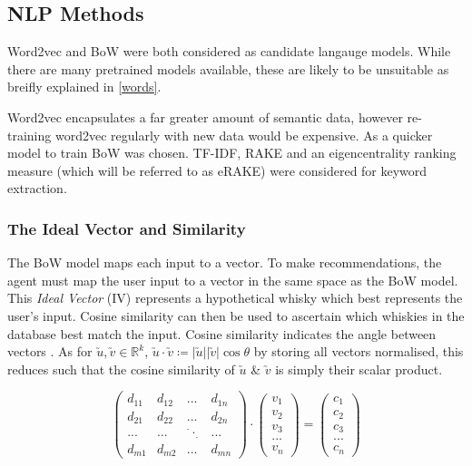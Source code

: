 \subsection{NLP Methods}\label{whiskylang}
Word2vec and BoW were both considered as candidate langauge models. While there are
many pretrained models available, these are likely to be unsuitable as breifly
explained in \autoref{words}.

Word2vec encapsulates a far greater amount of semantic data, however re-training
word2vec regularly with new data would be expensive. As a quicker model to train
BoW was chosen.  TF-IDF, RAKE and an eigencentrality ranking measure (which will
be referred to as eRAKE) were considered for keyword extraction.

\subsubsection{The Ideal Vector and Similarity}\label{sssec:cossim}
The BoW model maps each input to a vector. To make recommendations, the agent must
map the user input to a vector in the same space as the BoW model. This
\emph{Ideal Vector} (IV) represents a hypothetical whisky which best represents 
the user's input. Cosine similarity can then be used to ascertain which whiskies in 
the database best match the input.  Cosine similarity indicates the angle between
vectors \cite{Melville2010}. As for $\utilde{u}, \utilde{v}\in \mathbb{R} ^{k}$, 
$\utilde{u} \cdot \utilde{v} \coloneqq \vert \utilde{u} \vert \vert \utilde{v} \vert \cos{\theta}$
by storing all vectors normalised, this reduces such that the cosine similarity of
$\utilde{u}$ \& $\utilde{v}$ is simply their scalar product.

\begin{equation}\label{eqn:cossim}
    \begin{pmatrix}
        d_{11} & d_{12} & ... & d_{1n}\\
        d_{21} & d_{22} & ... & d_{2n}\\
        ...    & ...    & ^{\cdot}\cdot _{\cdot} & ...   \\
        d_{m1} & d_{m2} & ... & d_{mn}
    \end{pmatrix}
    \cdot
    \begin{pmatrix}
        v_1 \\ v_2 \\ v_3 \\ ... \\ v_n
    \end{pmatrix}
    =
    \begin{pmatrix}
        c_1 \\ c_2 \\ c_3 \\ ... \\ c_n
    \end{pmatrix}
\end{equation}

